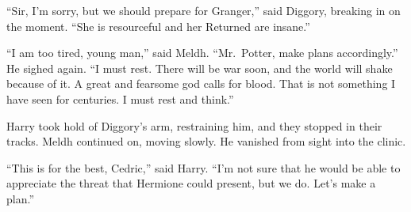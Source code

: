 ``Sir, I'm sorry, but we should prepare for Granger,'' said Diggory,
breaking in on the moment. ``She is resourceful and her Returned are
insane.''

``I am too tired, young man,'' said Meldh. ``Mr.~Potter, make plans
accordingly.'' He sighed again. ``I must rest. There will be war soon,
and the world will shake because of it. A great and fearsome god calls
for blood. That is not something I have seen for centuries. I must rest
and think.''

Harry took hold of Diggory's arm, restraining him, and they stopped in
their tracks. Meldh continued on, moving slowly. He vanished from sight
into the clinic.

``This is for the best, Cedric,'' said Harry. ``I'm not sure that he
would be able to appreciate the threat that Hermione could present, but
we do. Let's make a plan.''
